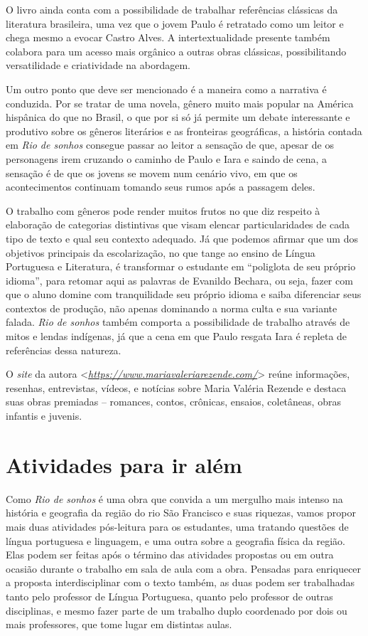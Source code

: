 \documentclass{extrarticle}
\begin{document}
  O livro ainda conta com a possibilidade de trabalhar referências
  clássicas da literatura brasileira, uma vez que o jovem Paulo é
  retratado como um leitor e chega mesmo a evocar Castro Alves. A
  intertextualidade presente também colabora para um acesso mais
  orgânico a outras obras clássicas, possibilitando versatilidade e
  criatividade na abordagem.

  Um outro ponto que deve ser mencionado é a maneira como a narrativa é
  conduzida. Por se tratar de uma novela, gênero muito mais popular na
  América hispânica do que no Brasil, o que por si só já permite um
  debate interessante e produtivo sobre os gêneros literários e as
  fronteiras geográficas, a história contada em \emph{Rio de sonhos}
  consegue passar ao leitor a sensação de que, apesar de os personagens
  irem cruzando o caminho de Paulo e Iara e saindo de cena, a sensação é
  de que os jovens se movem num cenário vivo, em que os acontecimentos
  continuam tomando seus rumos após a passagem deles.

  O trabalho com gêneros pode render muitos frutos no que diz respeito à
  elaboração de categorias distintivas que visam elencar
  particularidades de cada tipo de texto e qual seu contexto adequado.
  Já que podemos afirmar que um dos objetivos principais da
  escolarização, no que tange ao ensino de Língua Portuguesa e
  Literatura, é transformar o estudante em ``poliglota de seu próprio
  idioma'', para retomar aqui as palavras de Evanildo Bechara, ou seja,
  fazer com que o aluno domine com tranquilidade seu próprio idioma e
  saiba diferenciar seus contextos de produção, não apenas dominando a
  norma culta e sua variante falada. \emph{Rio de sonhos} também
  comporta a possibilidade de trabalho através de mitos e lendas
  indígenas, já que a cena em que Paulo resgata Iara é repleta de
  referências dessa natureza.

  O \emph{site} da autora
  \textless{}\href{https://www.mariavaleriarezende.com/}{\emph{https://www.mariavaleriarezende.com/}}\textgreater{}
  reúne informações, resenhas, entrevistas, vídeos, e notícias sobre
  Maria Valéria Rezende e destaca suas obras premiadas -- romances,
  contos, crônicas, ensaios, coletâneas, obras infantis e juvenis.

  \section{Atividades para ir além}

  Como \emph{Rio de sonhos} é uma obra que convida a um mergulho mais
  intenso na história e geografia da região do rio São Francisco e suas
  riquezas, vamos propor mais duas atividades pós-leitura para os
  estudantes, uma tratando questões de língua portuguesa e linguagem, e
  uma outra sobre a geografia física da região. Elas podem ser feitas
  após o término das atividades propostas ou em outra ocasião durante o
  trabalho em sala de aula com a obra. Pensadas para enriquecer a
  proposta interdisciplinar com o texto também, as duas podem ser
  trabalhadas tanto pelo professor de Língua Portuguesa, quanto pelo
  professor de outras disciplinas, e mesmo fazer parte de um trabalho
  duplo coordenado por dois ou mais professores, que tome lugar em
  distintas aulas.
\end{document}
